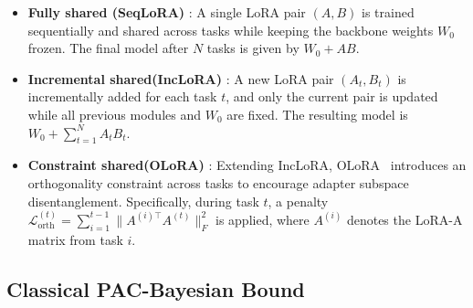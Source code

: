 \documentclass{article}
\theoremstyle{plain}
\theoremstyle{definition}
\theoremstyle{remark}
\begin{document}
\begin{itemize}
\vspace{-1em}
\item \textbf{Fully shared (SeqLoRA)} : A single LoRA pair $(A, B)$ is trained sequentially and shared across tasks while keeping the backbone weights $W_0$ frozen. The final model after $N$ tasks is given by $W_0 + AB$.
\vspace{-0.5em}
\item \textbf{Incremental shared(IncLoRA)} : A new LoRA pair $(A_t, B_t)$ is incrementally added for each task $t$, and only the current pair is updated while all previous modules and $W_0$ are fixed. The resulting model is $W_0 + \sum_{t=1}^N A_t B_t$.
\vspace{-0.25em}
\item \textbf{Constraint shared(OLoRA)} : Extending IncLoRA, OLoRA~\cite{wang2023orthogonal} introduces an orthogonality constraint across tasks to encourage adapter subspace disentanglement. Specifically, during task $t$, a penalty $\mathcal{L}_{\text{orth}}^{(t)} = \sum_{i=1}^{t-1} \|A^{(i)\top} A^{(t)}\|_F^2$ is applied, where $A^{(i)}$ denotes the LoRA-A matrix from task $i$.
\end{itemize}


\subsection{Classical PAC-Bayesian Bound}
\end{document}

